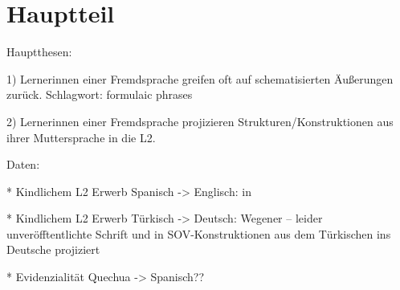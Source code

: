 \section{Hauptteil}

Hauptthesen:

1) Lernerinnen einer Fremdsprache greifen oft auf schematisierten Äußerungen zurück.
Schlagwort: formulaic phrases

2) Lernerinnen einer Fremdsprache projizieren Strukturen/Konstruktionen aus ihrer Muttersprache in die L2.

Daten:

* Kindlichem L2 Erwerb Spanisch -> Englisch: \cite{Wong-Fillmore76} in \cite{Haberzettl06}

* Kindlichem L2 Erwerb Türkisch -> Deutsch: Wegener\cite{} -- leider unveröfftentlichte Schrift
und \cite{Haberzettl05} in \cite{Haberzettl06}
SOV-Konstruktionen aus dem Türkischen ins Deutsche projiziert

* Evidenzialität Quechua -> Spanisch??
